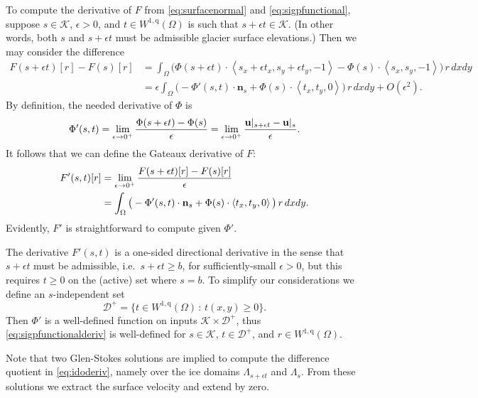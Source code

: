 \documentclass[letterpaper,final,12pt,reqno]{amsart}
\theoremstyle{claim}
\newcommand{\eps}{\epsilon}
\newcommand{\bn}{\mathbf{n}}
\newcommand{\bu}{\mathbf{u}}
\newcommand{\qq}{{\text{q}}}
\numberwithin{equation}{section}
\numberwithin{figure}{section}
\numberwithin{table}{section}
\numberwithin{theorem}{section}
\begin{document}
To compute the derivative of $F$ from \eqref{eq:surfacenormal} and \eqref{eq:sigpfunctional}, suppose $s\in \mathcal{K}$, $\eps>0$, and $t \in W^{1,\qq}(\Omega)$ is such that $s+\eps t \in \mathcal{K}$.  (In other words, both $s$ and $s+\eps t$ must be admissible glacier surface elevations.)  Then we may consider the difference
\begin{align*}
F(s+\eps t)[r] - F(s)[r] &= \int_\Omega \Big(\Phi(s+\eps t) \cdot \left<s_x+\eps t_x,s_y+\eps t_y,-1\right> - \Phi(s) \cdot \left<s_x,s_y,-1\right>\Big)\, r \,dx dy \\
    &= \eps \int_\Omega \big(-\Phi'(s,t) \cdot \bn_s + \Phi(s) \cdot \left<t_x,t_y,0\right>\big)\, r \,dx dy + O(\eps^2).
\end{align*}
By definition, the needed derivative of $\Phi$ is
\begin{equation}
\Phi'(s,t) = \lim_{\eps\to 0^+} \frac{\Phi(s+\eps t) - \Phi(s)}{\eps} = \lim_{\eps\to 0^+} \frac{\bu|_{s+\eps t} - \bus}{\eps}. \label{eq:idoderiv}
\end{equation}
It follows that we can define the Gateaux derivative of $F$:
\begin{align}
F'(s,t)[r] &= \lim_{\eps\to 0^+} \frac{F(s+\eps t)[r] - F(s)[r]}{\eps}  \label{eq:sigpfunctionalderiv} \\
    &= \int_\Omega \big(-\Phi'(s,t) \cdot \bn_s + \Phi(s) \cdot \left<t_x,t_y,0\right>\big)\, r \,dx dy. \notag
\end{align}
Evidently, $F'$ is straightforward to compute given $\Phi'$.

The derivative $F'(s,t)$ is a one-sided directional derivative in the sense that $s+\eps t$ must be admissible, i.e.~$s+\eps t\ge b$, for sufficiently-small $\eps>0$, but this requires $t\ge 0$ on the (active) set where $s=b$.  To simplify our considerations we define an $s$-independent set
\begin{equation}
\mathcal{D}^+ = \{t \in W^{1,\qq}(\Omega) \,:\, t(x,y) \ge 0\}. \label{eq:infdefectset}
\end{equation}
Then $\Phi'$ is a well-defined function on inputs $\mathcal{K} \times \mathcal{D}^+$, thus \eqref{eq:sigpfunctionalderiv} is well-defined for $s\in \mathcal{K}$, $t\in \mathcal{D}^+$, and $r \in W^{1,\qq}(\Omega)$.

Note that two Glen-Stokes solutions are implied to compute the difference quotient in \eqref{eq:idoderiv}, namely over the ice domains $\Lambda_{s+\eps t}$ and $\Lambda_s$.  From these solutions we extract the surface velocity and extend by zero.
\end{document}
